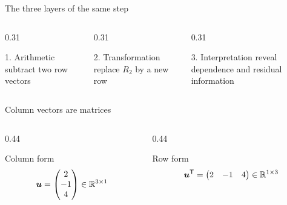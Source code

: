 \begin{frame}{The three layers of the same step}
  \begin{columns}[T,onlytextwidth]
    \begin{column}{0.31\textwidth}
      \begin{block}{1. Arithmetic}
        subtract two row vectors
      \end{block}
    \end{column}
    \begin{column}{0.31\textwidth}
      \begin{exampleblock}{2. Transformation}
        replace $R_2$ by a new row
      \end{exampleblock}
    \end{column}
    \begin{column}{0.31\textwidth}
      \begin{alertblock}{3. Interpretation}
        reveal dependence and residual information
      \end{alertblock}
    \end{column}
  \end{columns}

  \vspace{0.8cm}
\end{frame}

\begin{frame}{Column vectors are matrices}
  \begin{columns}[T,onlytextwidth]
    \begin{column}{0.44\textwidth}
      \begin{block}{Column form}
        \[
        \bm{u}=\begin{pmatrix}2\\-1\\4\end{pmatrix}
        \in\mathbb{R}^{3\times1}
        \]
      \end{block}
    \end{column}
    \begin{column}{0.44\textwidth}
      \begin{exampleblock}{Row form}
        \[
        \bm{u}^{\mathsf T}=\begin{pmatrix}2&-1&4\end{pmatrix}
        \in\mathbb{R}^{1\times3}
        \]
      \end{exampleblock}
    \end{column}
  \end{columns}

  \vspace{0.55cm}
\end{frame}
